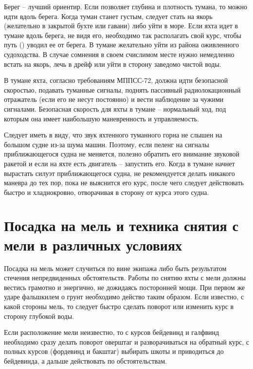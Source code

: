 Берег \--- лучший ориентир. Если позволяет глубина и плотность тумана, то можно идти вдоль берега. Когда туман станет густым, следует стать на якорь (желательно в закрытой бухте или гавани) либо уйти в море. Если яхта идет в тумане вдоль берега, не видя его, необходимо так располагать свой курс, чтобы путь (\PU) уводил ее от берега. В тумане желательно уйти из района оживленного судоходства. В случае сомнения в своем счислимом месте нужно немедленно встать на якорь, лечь в дрейф или уйти в сторону заведомо чистой воды. 

В тумане яхта, согласно требованиям МППСС-72, должна идти безопасной скоростью, подавать туманные сигналы, поднять пассивный радиолокационный отражатель (если его не несут постоянно) и вести наблюдение за чужими сигналами. Безопасная скорость для яхты в тумане \--- нормальный ход, под которым она имеет наибольшую маневренность и управляемость. 

Следует иметь в виду, что звук яхтенного туманного горна не слышен на большом судне из-за шума машин. Поэтому, если пеленг на сигналы приближающегося судна не меняется, полезно обратить его внимание звуковой ракетой и если на яхте есть двигатель \--- запустить его. Когда в тумане начнет вырастать силуэт приближающегося судна, не рекомендуется делать никакого маневра до тех пор, пока не выяснится его курс, после чего следует действовать быстро и хладнокровно, отворачивая в сторону от курса этого судна.

\section{Посадка на мель и техника снятия с мели в различных условиях}

Посадка на мель может случиться по вине экипажа либо быть результатом стечения непредвиденных обстоятельств. Работы по снятию яхты с мели должны вестись грамотно и энергично, не дожидаясь посторонней мощи. При первом же ударе фальшкилем о грунт необходимо действо таким образом. Если известно, с какой стороны мель, то следует быстро сделать поворот или изменить курс в сторону глубокой воды.

Если расположение мели неизвестно, то с курсов бейдевинд и галфвинд необходимо сразу делать поворот оверштаг и разворачиваться на обратный курс, с полных курсов (фордевинд и бакштаг) выбирать шкоты и приводиться до бейдевинда, а дальше действовать по обстоятельствам. 


